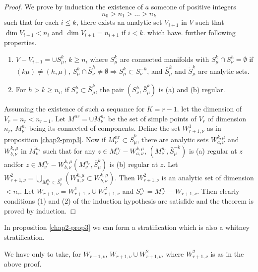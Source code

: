 \begin{proof}
  We prove by induction the existence of $a$ someone of positive integers
  $$
  n_{0} > n_{1}> \dots > n_{k}
  $$
  such that for each $i\leq k$, there exists an analytic set $V_{i+1}$
  in $V$ such that $\dim V_{i+1}<
  n_{i}$ and $\dim V_{i+1} = n_{i+1}$ if $i< k$. which
  have. further following properties. 
\begin{enumerate}[(1)]
\item $V-V_{i+1} = \cup S^{k}_{\mu}$, $k \geq n_{i}$ where 
  $S^{k}_{\mu}$ are connected manifolds with $S^{k}_{\mu} \cap
  S^{h}_{\nu} =\emptyset$ if $(k \mu) \neq (h, \mu)$, $S^{k}_{\mu}\cap
  \bar{S}^{h}_{\nu}\neq \emptyset \Rightarrow
  S^{k}_{\mu} \subset S^{-h}_{\nu}$,  and  $\bar{S}^{k}_{\mu}$
    and $\dot{S}^{k}_{\mu}$ are analytic sets.
 
\item For $h>k\geq n_{i}$, if $S^{h}_{\nu} \subset \bar{S}^{k}_{\mu}$,
  the pair $(S^{h}_{\nu}, \bar{S}^{k}_{\mu})$ is (a) and (b) regular. 
\end{enumerate}

Assuming the existence of such $a$ sequance for $K=r-1$. let the
dimension of $V_{r} = n_{r}< n_{r-1}$. Let  $M^{nr} = \cup
M^{n_r}_{\nu}$ be the set of simple points of $V_{r}$ of 
  dimension  $n_{r}$, $M^{n_r}_{\nu}$ being its connected of
components. Define the set $W^{1}_{r+1,\nu}$ as in proposition
\ref{chap2-prop3}. Now if 
$M^{nr}_{\nu}\subset \bar{S}^{k}_{\mu}$, there are analytic sets  $W^{k,
  \mu}_{a, \nu}$  and  $W^{k,\mu}_{b,\nu}$ in
$\overline{M^{n_r}_{\nu}}$ such that for any $z\in M^{n_r}_{\nu} - W^{k,
  \mu}_{a,\nu}$, $(M^{n_r}_{\nu}, \bar{S}^{-k}_{\mu})$ is (a) regular
at $z$ and\pageoriginale for  $z\in
M^{n_r}_{\nu} - W^{k, \mu}_{b, \nu}(M^{n_r}_{\nu}, \bar{S}^{k}_{\mu})$  is
(b) regular at $z$. Let $W^{2}_{r+1,\nu}= \bigcup\limits_{M^{n_r}_\nu
  \subset \bar{S}^k_\mu}  (W^{k,\mu}_{a,\nu} \subset W^{k,
  \mu}_{b,\nu})$. Then  $W^{2}_{r+1, \nu}$ is an analytic set of
dimension $< n_{r}$.  Let $W_{r+1, \nu} = W^{1}_{r+1, \nu} \cup
W^{2}_{r+1, \nu}$  and  $S^{n_r}_{\nu} = M^{n_r}_{\nu} - W_{r+1,
  \nu}$. Then clearly conditions (1) and (2) of the induction
hypothesis are satisfide and the theorem is proved by induction. 
\end{proof}

\setcounter{prop'}{2}
\begin{prop'} %
In proposition \ref{chap2-prop3} we can form a stratification which is also a
  whitney stratification. 
\end{prop'}

We have only to take, for $W_{r+1, \nu}$, $W_{r+1, \nu} \cup W^{2}_{r+1,
  \nu}$,  where  $W^{2}_{r+1, \nu}$ is as in the above proof. 
